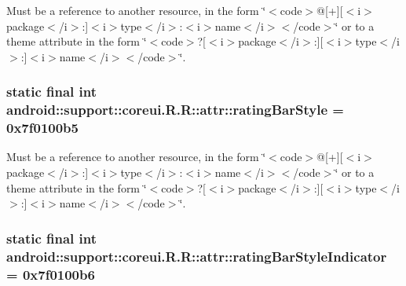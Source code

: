 Must be a reference to another resource, in the form \char`\"{}$<$code$>$@\mbox{[}+\mbox{]}\mbox{[}$<$i$>$package$<$/i$>$:\mbox{]}$<$i$>$type$<$/i$>$:$<$i$>$name$<$/i$>$$<$/code$>$\char`\"{} or to a theme attribute in the form \char`\"{}$<$code$>$?\mbox{[}$<$i$>$package$<$/i$>$:\mbox{]}\mbox{[}$<$i$>$type$<$/i$>$:\mbox{]}$<$i$>$name$<$/i$>$$<$/code$>$\char`\"{}. \hypertarget{classandroid_1_1support_1_1coreui_1_1_r_1_1attr_bfd577b1935de23c267ae14ba99eab73}{
\subsubsection[{ratingBarStyle}]{\setlength{\rightskip}{0pt plus 5cm}static final int android::support::coreui.R.R::attr::ratingBarStyle = 0x7f0100b5}}
\label{classandroid_1_1support_1_1coreui_1_1_r_1_1attr_bfd577b1935de23c267ae14ba99eab73}


Must be a reference to another resource, in the form \char`\"{}$<$code$>$@\mbox{[}+\mbox{]}\mbox{[}$<$i$>$package$<$/i$>$:\mbox{]}$<$i$>$type$<$/i$>$:$<$i$>$name$<$/i$>$$<$/code$>$\char`\"{} or to a theme attribute in the form \char`\"{}$<$code$>$?\mbox{[}$<$i$>$package$<$/i$>$:\mbox{]}\mbox{[}$<$i$>$type$<$/i$>$:\mbox{]}$<$i$>$name$<$/i$>$$<$/code$>$\char`\"{}. \hypertarget{classandroid_1_1support_1_1coreui_1_1_r_1_1attr_f5ed84901d14b705db4fed8af94a7957}{
\subsubsection[{ratingBarStyleIndicator}]{\setlength{\rightskip}{0pt plus 5cm}static final int android::support::coreui.R.R::attr::ratingBarStyleIndicator = 0x7f0100b6}}
\label{classandroid_1_1support_1_1coreui_1_1_r_1_1attr_f5ed84901d14b705db4fed8af94a7957}


